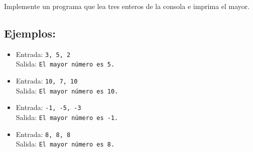 Implemente un programa que lea tres enteros de la consola e imprima el mayor.
\subsection*{Ejemplos:}
\begin{itemize}
    \item Entrada: \texttt{3, 5, 2}\\
          Salida: \texttt{El mayor número es 5.}
    \item Entrada: \texttt{10, 7, 10}\\
          Salida: \texttt{El mayor número es 10.}
    \item Entrada: \texttt{-1, -5, -3}\\
          Salida: \texttt{El mayor número es -1.}
    \item Entrada: \texttt{8, 8, 8}\\
          Salida: \texttt{El mayor número es 8.}
\end{itemize}